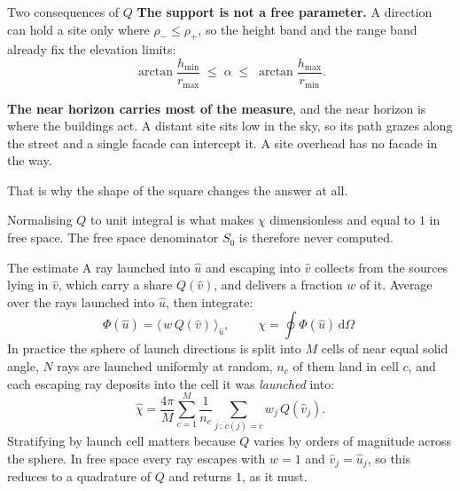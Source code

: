 \documentclass[aspectratio=169,11pt]{beamer}
\newcommand{\uloc}{\hat{u}}
\newcommand{\uext}{\hat{v}}
\newcommand{\dOmega}{\,\mathrm{d}\Omega}
\begin{document}
\begin{frame}{Two consequences of $Q$}
  \textbf{The support is not a free parameter.} A direction can hold a site only
  where $\rho_- \le \rho_+$, so the height band and the range band already fix
  the elevation limits:
  \begin{equation*}
    \arctan\frac{h_{\min}}{r_{\max}} \;\le\; \alpha \;\le\; \arctan\frac{h_{\max}}{r_{\min}} .
  \end{equation*}

  \vspace{0.5em}
  \textbf{The near horizon carries most of the measure}, and the near horizon is
  where the buildings act. A distant site sits low in the sky, so its path grazes
  along the street and a single facade can intercept it. A site overhead has no
  facade in the way.

  \vspace{0.5em}
  That is why the shape of the square changes the answer at all.

  \vspace{0.5em}
  Normalising $Q$ to unit integral is what makes $\chi$ dimensionless and equal
  to $1$ in free space. The free space denominator $S_0$ is therefore never
  computed.
\end{frame}

\begin{frame}{The estimate}
  A ray launched into $\uloc$ and escaping into $\uext$ collects from the sources
  lying in $\uext$, which carry a share $Q(\uext)$, and delivers a fraction $w$
  of it. Average over the rays launched into $\uloc$, then integrate:
  \begin{equation*}
    \Phi(\uloc) = \big\langle\, w \, Q(\uext) \,\big\rangle_{\uloc} ,
    \qquad
    \boxed{\;\chi = \oint \Phi(\uloc) \dOmega\;}
  \end{equation*}
  In practice the sphere of launch directions is split into $M$ cells of near
  equal solid angle, $N$ rays are launched uniformly at random, $n_c$ of them
  land in cell $c$, and each escaping ray deposits into the cell it was
  \emph{launched} into:
  \begin{equation*}
    \hat{\chi} = \frac{4\pi}{M} \sum_{c=1}^{M} \frac{1}{n_c}
    \sum_{j\,:\,c(j)=c} w_j \, Q(\uext_j) .
  \end{equation*}
  Stratifying by launch cell matters because $Q$ varies by orders of magnitude
  across the sphere. In free space every ray escapes with $w = 1$ and $\uext_j =
  \uloc_j$, so this reduces to a quadrature of $Q$ and returns $1$, as it must.
\end{frame}
\end{document}
